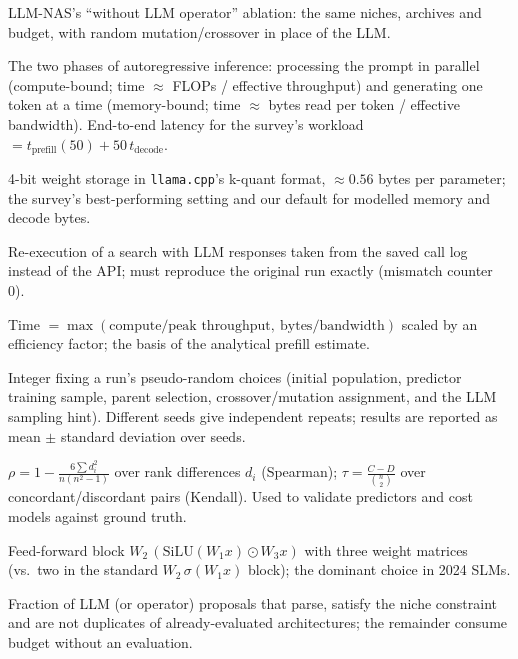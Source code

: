 \documentclass[11pt,a4paper]{article}
\newcommand{\code}[1]{\texttt{#1}}
\begin{document}
\begin{description}[style=nextline,leftmargin=0pt,itemsep=3pt]
\item[PEA (partitioned evolutionary algorithm).] LLM-NAS's ``without LLM operator'' ablation: the same niches, archives and budget, with random mutation/crossover in place of the LLM.

\item[Prefill / decode.] The two phases of autoregressive inference: processing the prompt in parallel (compute-bound; time $\approx$ FLOPs / effective throughput) and generating one token at a time (memory-bound; time $\approx$ bytes read per token / effective bandwidth). End-to-end latency for the survey's workload $= t_{\text{prefill}}(50)+50\,t_{\text{decode}}$.

\item[Quantisation (Q4\_K\_M).] 4-bit weight storage in \code{llama.cpp}'s k-quant format, $\approx0.56$ bytes per parameter; the survey's best-performing setting and our default for modelled memory and decode bytes.

\item[Replay.] Re-execution of a search with LLM responses taken from the saved call log instead of the API; must reproduce the original run exactly (mismatch counter 0).

\item[Roofline model.] Time $=\max(\text{compute}/\text{peak throughput},\ \text{bytes}/\text{bandwidth})$ scaled by an efficiency factor; the basis of the analytical prefill estimate.

\item[Seed.] Integer fixing a run's pseudo-random choices (initial population, predictor training sample, parent selection, crossover/mutation assignment, and the LLM sampling hint). Different seeds give independent repeats; results are reported as mean $\pm$ standard deviation over seeds.

\item[Spearman / Kendall rank correlation.] $\rho=1-\frac{6\sum d_i^2}{n(n^2-1)}$ over rank differences $d_i$ (Spearman); $\tau=\frac{C-D}{\binom{n}{2}}$ over concordant/discordant pairs (Kendall). Used to validate predictors and cost models against ground truth.

\item[SwiGLU / gated FFN.] Feed-forward block $W_2\,(\mathrm{SiLU}(W_1x)\odot W_3x)$ with three weight matrices (vs.\ two in the standard $W_2\,\sigma(W_1x)$ block); the dominant choice in 2024 SLMs.

\item[Usable proposal rate.] Fraction of LLM (or operator) proposals that parse, satisfy the niche constraint and are not duplicates of already-evaluated architectures; the remainder consume budget without an evaluation.


\end{description}
\end{document}
